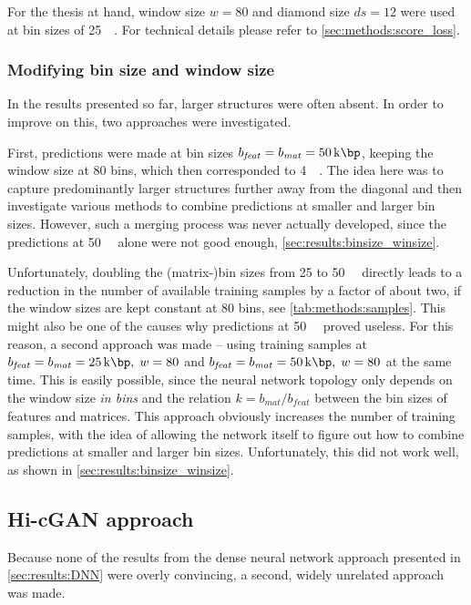 For the thesis at hand, window size $w=80$ and diamond size $ds={12}$ were used at bin sizes of \SI{25}{\kilo\bp}.
For technical details please refer to \cref{sec:methods:score_loss}.

\subsubsection{Modifying bin size and window size}\label{sec:improve:binsize_winsize}
In the results presented so far, larger structures were often absent.
In order to improve on this, two approaches were investigated.

First, predictions were made at bin sizes $b_\mathit{feat} = b_\mathit{mat} = \SI{50}{\kilo\bp}$, 
keeping the window size at 80 bins, which then corresponded to \SI{4}{\mega\bp}.
The idea here was to capture predominantly larger structures further away from the diagonal and
then investigate various methods to combine predictions at smaller and larger bin sizes.
However, such a merging process was never actually developed,
since the predictions at \SI{50}{\kilo\bp} alone were not good enough, \cref{sec:results:binsize_winsize}.

Unfortunately, doubling the (matrix-)bin sizes from 25 to \SI{50}{\kilo\bp} directly leads to a reduction in the number of available training samples by a factor of about two, 
if the window sizes are kept constant at 80 bins, see \cref{tab:methods:samples}. 
This might also be one of the causes why predictions at \SI{50}{\kilo\bp} proved useless.
For this reason, a second approach was made -- using training samples at $b_\mathit{feat} = b_\mathit{mat} = \SI{25}{\kilo\bp},\;w=80$
and $b_\mathit{feat} = b_\mathit{mat} = \SI{50}{\kilo\bp},\;w=80$ at the same time.
This is easily possible, since the neural network topology only depends on the window size \emph{in bins} and the relation $k=b_\mathit{mat}/b_\mathit{feat}$
between the bin sizes of features and matrices.
This approach obviously increases the number of training samples,
with the idea of allowing the network itself to figure out how to combine predictions at smaller and larger bin sizes.
Unfortunately, this did not work well, as shown in \cref{sec:results:binsize_winsize}.

\subsection{Hi-cGAN approach} \label{sec:improve:Hi-cGAN}
Because none of the results from the dense neural network approach presented in \cref{sec:results:DNN} were overly convincing,
a second, widely unrelated approach was made.

